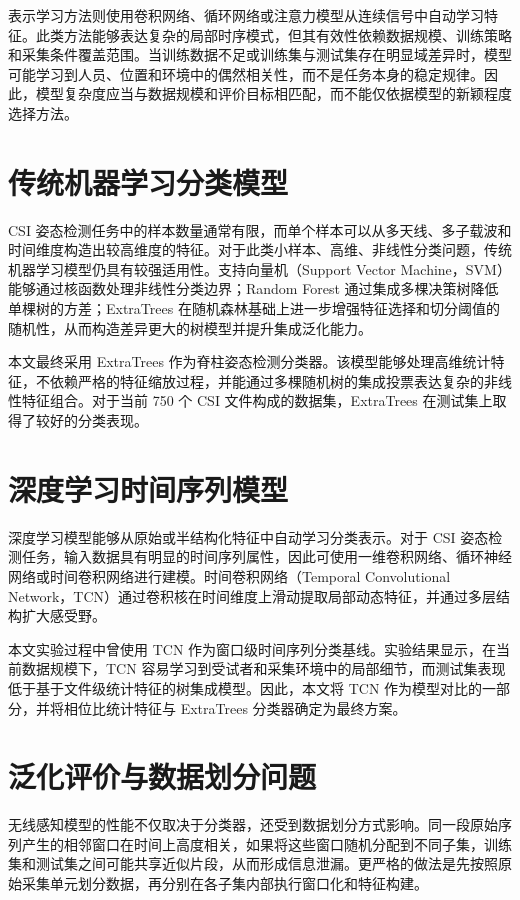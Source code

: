 表示学习方法则使用卷积网络、循环网络或注意力模型从连续信号中自动学习特征。此类方法能够表达复杂的局部时序模式，但其有效性依赖数据规模、训练策略和采集条件覆盖范围。当训练数据不足或训练集与测试集存在明显域差异时，模型可能学习到人员、位置和环境中的偶然相关性，而不是任务本身的稳定规律。因此，模型复杂度应当与数据规模和评价目标相匹配，而不能仅依据模型的新颖程度选择方法。

\section{传统机器学习分类模型}
CSI 姿态检测任务中的样本数量通常有限，而单个样本可以从多天线、多子载波和时间维度构造出较高维度的特征。对于此类小样本、高维、非线性分类问题，传统机器学习模型仍具有较强适用性。支持向量机（Support Vector Machine，SVM）能够通过核函数处理非线性分类边界\cite{svm1995}；Random Forest 通过集成多棵决策树降低单棵树的方差\cite{randomforest2001}；ExtraTrees 在随机森林基础上进一步增强特征选择和切分阈值的随机性，从而构造差异更大的树模型并提升集成泛化能力\cite{extratrees2006}。

本文最终采用 ExtraTrees 作为脊柱姿态检测分类器。该模型能够处理高维统计特征，不依赖严格的特征缩放过程，并能通过多棵随机树的集成投票表达复杂的非线性特征组合。对于当前 750 个 CSI 文件构成的数据集，ExtraTrees 在测试集上取得了较好的分类表现。

\section{深度学习时间序列模型}
深度学习模型能够从原始或半结构化特征中自动学习分类表示。对于 CSI 姿态检测任务，输入数据具有明显的时间序列属性，因此可使用一维卷积网络、循环神经网络或时间卷积网络进行建模。时间卷积网络（Temporal Convolutional Network，TCN）通过卷积核在时间维度上滑动提取局部动态特征，并通过多层结构扩大感受野\cite{tcn2018}。

本文实验过程中曾使用 TCN 作为窗口级时间序列分类基线。实验结果显示，在当前数据规模下，TCN 容易学习到受试者和采集环境中的局部细节，而测试集表现低于基于文件级统计特征的树集成模型。因此，本文将 TCN 作为模型对比的一部分，并将相位比统计特征与 ExtraTrees 分类器确定为最终方案。

\section{泛化评价与数据划分问题}
无线感知模型的性能不仅取决于分类器，还受到数据划分方式影响。同一段原始序列产生的相邻窗口在时间上高度相关，如果将这些窗口随机分配到不同子集，训练集和测试集之间可能共享近似片段，从而形成信息泄漏。更严格的做法是先按照原始采集单元划分数据，再分别在各子集内部执行窗口化和特征构建。

